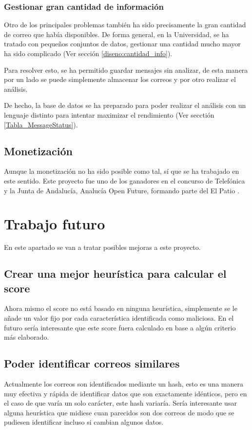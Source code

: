 \subsubsection{Gestionar gran cantidad de información}
Otro de los principales problemas también ha sido precisamente la gran cantidad de correo que había disponibles. De forma general, en la Universidad, se ha tratado con pequeños conjuntos de datos, gestionar una cantidad mucho mayor ha sido complicado (Ver sección \ref{diseno:cantidad_info}). 

Para resolver esto, se ha permitido guardar mensajes sin analizar, de esta manera por un lado se puede simplemente almacenar los correos y por otro realizar el análisis. 

De hecho, la base de datos se ha preparado para poder realizar el análisis con un lenguaje distinto para intentar maximizar el rendimiento (Ver secctión \ref{Tabla_MessageStatus}). 

\subsection{Monetización}
Aunque la monetización no ha sido posible como tal, sí que se ha trabajado en este sentido.
Este proyecto fue uno de los ganadores en el concurso de Telefónica y la Junta de Andalucía, Analucía Open Future, formando parte del El Patio \cite{AOF}.

\section{Trabajo futuro}

En este apartado se van a tratar posibles mejoras a este proyecto. 

\subsection{Crear una mejor heurística para calcular el score}
Ahora mismo el score no está basado en ninguna heurística, simplemente se le añade un valor fijo por cada característica identificada como maliciosa. En el futuro sería interesante que este score fuera calculado en base a algún criterio más elaborado. 

\subsection{Poder identificar correos similares}
Actualmente los correos son identificados mediante un hash, esto es una manera muy efectiva y rápida de identificar datos que son exactamente idénticos, pero en el caso de que varía un solo carácter, este hash variaría. Sería interesante usar alguna heurística que midiese cuan parecidos son dos correos de modo que se pudiesen identificar incluso si cambian algunos datos. 

